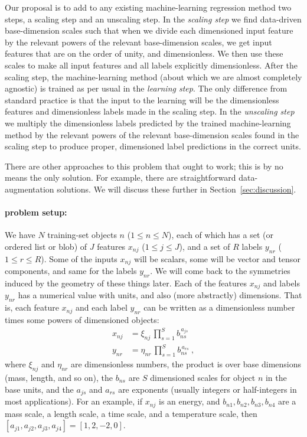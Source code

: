 \documentclass{article}
\newcommand{\sectionname}{Section}
\newcommand{\secref}[1]{\sectionname~\ref{#1}}
\begin{document}
Our proposal is to add to any existing machine-learning regression method two steps, a scaling step and an unscaling step.
In the \emph{scaling step} we find data-driven base-dimension scales such that when we divide each dimensioned input feature by the relevant powers of the relevant base-dimension scales, we get input features that are on the order of unity, and dimensionless.
We then use these scales to make all input features and all labels explicitly dimensionless.
After the scaling step, the machine-learning method (about which we are almost completely agnostic) is trained as per usual in the \emph{learning step}.
The only difference from standard practice is that the input to the learning will be the dimensionless features and dimensionless labels made in the scaling step.
In the \emph{unscaling step} we multiply the dimensionless labels predicted by the trained machine-learning method by the relevant powers of the relevant base-dimension scales found in the scaling step to produce proper, dimensioned label predictions in the correct units.

There are other approaches to this problem that ought to work; this is by no means the only solution.
For example, there are straightforward data-augmentation solutions.
We will discuss these further in \secref{sec:discussion}.

\paragraph{problem setup:} 
We have $N$ training-set objects $n$ ($1\leq n\leq N$), each of which has a set (or ordered list or blob) of $J$ features $x_{nj}$ ($1\leq j\leq J$), and a set of $R$ labels $y_{nr}$ ($1\leq r\leq R$).
Some of the inputs $x_{nj}$ will be scalars, some will be vector and tensor components, and same for the labels $y_{nr}$.
We will come back to the symmetries induced by the geometry of these things later.
Each of the features $x_{nj}$ and labels $y_{nr}$ has a numerical value with units, and also (more abstractly) dimensions.
That is, each feature $x_{nj}$ and each label $y_{nr}$ can be written as a dimensionless number times some powers of dimensioned objects:
\begin{align}\label{eq:xnj}
    x_{nj} &= \xi_{nj} \,\prod_{s=1}^S b_{ns}^{\,a_{js}} \\
    y_{nr} &= \eta_{nr}\,\prod_{s=1}^S b_{ns}^{\,a_{rs}} ~,
\end{align}
where $\xi_{nj}$ and $\eta_{nr}$ are dimensionless numbers, the product is over base dimensions (mass, length, and so on), the $b_{ns}$ are $S$ dimensioned scales for object $n$ in the base units, and the $a_{js}$ and $a_{rs}$ are exponents (usually integers or half-integers in most applications).
For an example, if $x_{nj}$ is an energy, and $b_{n1}, b_{n2}, b_{n3}, b_{n4}$ are a mass scale, a length scale, a time scale, and a temperature scale, then $[a_{j1}, a_{j2}, a_{j3}, a_{j4}] = [1, 2, -2, 0]$.
\end{document}
